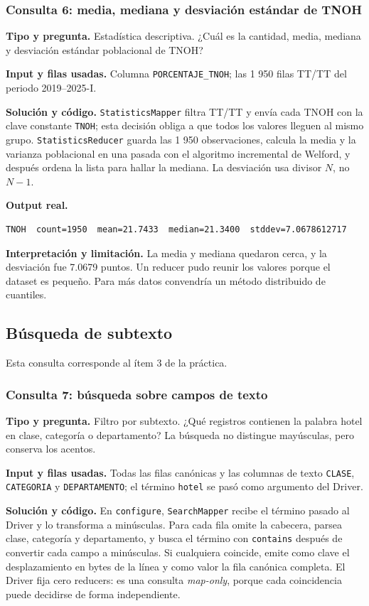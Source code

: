 \documentclass[10pt,a4paper]{article}
\theoremstyle{definition}
\begin{document}
\subsubsection{Consulta 6: media, mediana y desviación estándar de TNOH}
\textbf{Tipo y pregunta.} Estadística descriptiva. ¿Cuál es la cantidad, media,
mediana y desviación estándar poblacional de TNOH?

\textbf{Input y filas usadas.} Columna \texttt{PORCENTAJE\_TNOH}; las 1 950
filas TT/TT del periodo 2019--2025-I.

\textbf{Solución y código.} \texttt{StatisticsMapper} filtra TT/TT y envía cada
TNOH con la clave constante \texttt{TNOH}; esta decisión obliga a que todos los
valores lleguen al mismo grupo. \texttt{StatisticsReducer} guarda las 1 950
observaciones, calcula la media y la varianza poblacional en una pasada con el
algoritmo incremental de Welford, y después ordena la lista para hallar la
mediana. La desviación usa divisor $N$, no $N-1$.

\textbf{Output real.}
\begin{lstlisting}[style=resultado]
TNOH  count=1950  mean=21.7433  median=21.3400  stddev=7.0678612717
\end{lstlisting}
\textbf{Interpretación y limitación.} La media y mediana quedaron cerca, y la
desviación fue 7.0679 puntos. Un reducer pudo reunir los valores porque el
dataset es pequeño. Para más datos convendría un método distribuido de
cuantiles.

\subsection{Búsqueda de subtexto}
Esta consulta corresponde al ítem 3 de la práctica.
\subsubsection{Consulta 7: búsqueda sobre campos de texto}
\textbf{Tipo y pregunta.} Filtro por subtexto. ¿Qué registros contienen la
palabra hotel en clase, categoría o departamento? La búsqueda no distingue
mayúsculas, pero conserva los acentos.

\textbf{Input y filas usadas.} Todas las filas canónicas y las columnas de texto
\texttt{CLASE}, \texttt{CATEGORIA} y \texttt{DEPARTAMENTO}; el término
\texttt{hotel} se pasó como argumento del Driver.

\textbf{Solución y código.} En \texttt{configure}, \texttt{SearchMapper} recibe
el término pasado al Driver y lo transforma a minúsculas. Para cada fila omite
la cabecera, parsea clase, categoría y departamento, y busca el término con
\texttt{contains} después de convertir cada campo a minúsculas. Si cualquiera
coincide, emite como clave el desplazamiento en bytes de la línea y como valor
la fila canónica completa. El Driver fija cero reducers: es una consulta
\emph{map-only}, porque cada coincidencia puede decidirse de forma independiente.
\end{document}

